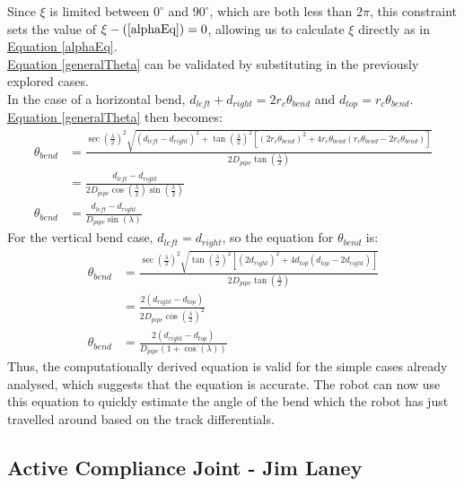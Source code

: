 \documentclass[11pt]{article}		%
\newcommand{\equationref}[1]{\hyperref[#1]{Equation \ref*{#1}}}     %
\begin{document}
		Since $\xi$ is limited between $0^\circ$ and $90^\circ$, which are both less than $2 \pi$, this constraint sets the value of $\xi - (\ref*{alphaEq}) = 0$, allowing us to calculate $\xi$ directly as in \equationref{alphaEq}.
		\\
		\equationref{generalTheta} can be validated by substituting in the previously explored cases.
		\\
		In the case of a horizontal bend, $d_{left} + d_{right} = 2 r_c \theta_{bend} $ and $d_{top} = r_c \theta_{bend}$.
		\equationref{generalTheta} then becomes:
		\begin{align*}
			\theta_{bend} &= \frac{ \sec \left( \frac{\lambda}{2} \right)^2 \sqrt{ \left( d_{left} - d_{right} \right)^2 +  \tan \left( \frac{\lambda}{2} \right)^2 \left[ \left( 2 r_c \theta_{bend} \right)^2 + 4 r_c \theta_{bend} \left( r_c \theta_{bend}  - 2 r_c \theta_{bend} \right) \right] } }{2 D_{pipe} \tan \left( \frac{\lambda}{2} \right)}
			\\
			&= \frac{d_{left} - d_{right}}{2 D_{pipe} \cos \left( \frac{\lambda}{2} \right) \sin \left( \frac{\lambda}{2} \right)}
			\\
			\theta_{bend} &= \frac{d_{left} - d_{right}}{D_{pipe} \sin \left( \lambda \right)}
		\end{align*}
		For the vertical bend case, $d_{left} = d_{right}$, so the equation for $\theta_{bend}$ is:
		\begin{align*}
			\theta_{bend} &= \frac{ \sec \left( \frac{\lambda}{2} \right)^2 \sqrt{ \tan \left( \frac{\lambda}{2} \right)^2 \left[ \left( 2 d_{right} \right)^2 + 4 d_{top} \left( d_{top} - 2 d_{right} \right) \right] } }{2 D_{pipe} \tan \left( \frac{\lambda}{2} \right)}
			\\
			&= \frac{2 \left( d_{right} - d_{top} \right)}{2 D_{pipe} \cos \left( \frac{\lambda}{2} \right)^2}
			\\
			\theta_{bend} &= \frac{2 \left( d_{right} - d_{top} \right)}{D_{pipe} \left( 1 + \cos \left( \lambda \right) \right)}
		\end{align*}
		Thus, the computationally derived equation is valid for the simple cases already analysed, which suggests that the equation is accurate.
		The robot can now use this equation to quickly estimate the angle of the bend which the robot has just travelled around based on the track differentials.
		 		
		\subsection[Active Compliance Joint]{Active Compliance Joint - Jim Laney}
		
\end{document}
